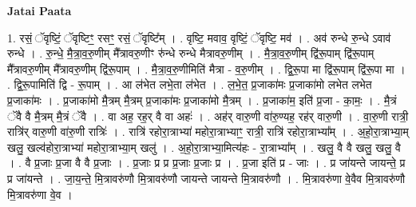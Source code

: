 \documentclass[17pt]{extarticle}
\begin{document}
\textbf{Jatai Paata} \newline

1. रसं॒ ॅवृष्टिं॒ ॅवृष्टिꣳ॒॒ रसꣳ॒॒ रसं॒ ॅवृष्टि᳚म् । . वृष्टि॒ मवाव॒ वृष्टिं॒ ॅवृष्टि॒ मव॑ । . अव॑ रुन्धे रु॒न्धे ऽवाव॑ रुन्धे । . रु॒न्धे॒ मै॒त्रा॒व॒रु॒णीम् मै᳚त्रावरु॒णीꣳ रु॑न्धे रुन्धे मैत्रावरु॒णीम् । . मै॒त्रा॒व॒रु॒णीम् द्वि॑रू॒पाम् द्वि॑रू॒पाम् मै᳚त्रावरु॒णीम् मै᳚त्रावरु॒णीम् द्वि॑रू॒पाम् । . मै॒त्रा॒व॒रु॒णीमिति॑ मैत्रा - व॒रु॒णीम् । . द्वि॒रू॒पा मा द्वि॑रू॒पाम् द्वि॑रू॒पा मा । . द्वि॒रू॒पामिति॑ द्वि - रू॒पाम् । . आ ल॑भेत लभे॒ता ल॑भेत । . ल॒भे॒त॒ प्र॒जाका॑मः प्र॒जाका॑मो लभेत लभेत प्र॒जाका॑मः । . प्र॒जाका॑मो मै॒त्रम् मै॒त्रम् प्र॒जाका॑मः प्र॒जाका॑मो मै॒त्रम् । . प्र॒जाका॑म॒ इति॑ प्र॒जा - का॒मः॒ । . मै॒त्रं ॅवै वै मै॒त्रम् मै॒त्रं ॅवै । . वा अह॒ रह॒र् वै वा अहः॑ । . अह॑र् वारु॒णी वा॑रु॒ण्यह॒ रह॑र् वारु॒णी । . वा॒रु॒णी रात्री॒ रात्रि॑र् वारु॒णी वा॑रु॒णी रात्रिः॑ । . रात्रि॑ रहोरा॒त्राभ्या॑ महोरा॒त्राभ्याꣳ॒॒ रात्री॒ रात्रि॑ रहोरा॒त्राभ्या᳚म् । . अ॒हो॒रा॒त्राभ्या॒म् खलु॒ खल्व॑होरा॒त्राभ्या॑ महोरा॒त्राभ्या॒म् खलु॑ । . अ॒हो॒रा॒त्राभ्या॒मित्य॑हः - रा॒त्राभ्या᳚म् । . खलु॒ वै वै खलु॒ खलु॒ वै । . वै प्र॒जाः प्र॒जा वै वै प्र॒जाः । . प्र॒जाः प्र प्र प्र॒जाः प्र॒जाः प्र । . प्र॒जा इति॑ प्र - जाः । . प्र जा॑यन्ते जायन्ते॒ प्र प्र जा॑यन्ते । . जा॒य॒न्ते॒ मि॒त्रावरु॑णौ मि॒त्रावरु॑णौ जायन्ते जायन्ते मि॒त्रावरु॑णौ । . मि॒त्रावरु॑णा वे॒वैव मि॒त्रावरु॑णौ मि॒त्रावरु॑णा वे॒व । \newline
\end{document}
